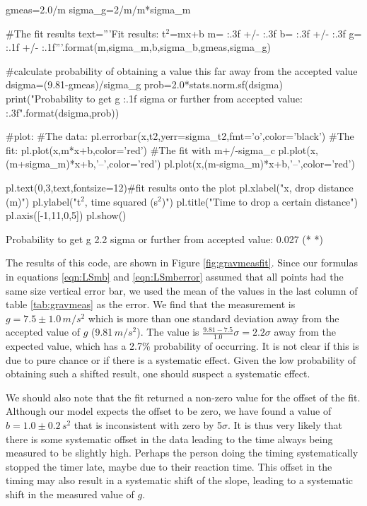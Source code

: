 \begin{example}
\begin{python}[caption = Linear fit with least squares]
gmeas=2.0/m
sigma_g=2/m/m*sigma_m

#The fit results
text='''Fit results: t$^2$=mx+b
m= {:.3f} +/- {:.3f}
b= {:.3f} +/- {:.3f}
g= {:.1f} +/- {:.1f}'''.format(m,sigma_m,b,sigma_b,gmeas,sigma_g)

#calculate probability of obtaining a value this far away from the accepted value
dsigma=(9.81-gmeas)/sigma_g
prob=2.0*stats.norm.sf(dsigma)
print("Probability to get g {:.1f} sigma or further from accepted value: {:.3f}".format(dsigma,prob))

#plot:
#The data:
pl.errorbar(x,t2,yerr=sigma_t2,fmt='o',color='black')
#The fit:
pl.plot(x,m*x+b,color='red')
#The fit with m+/-sigma_c
pl.plot(x,(m+sigma_m)*x+b,'--',color='red')
pl.plot(x,(m-sigma_m)*x+b,'--',color='red')

pl.text(0,3,text,fontsize=12)#fit results onto the plot
pl.xlabel("x, drop distance (m)")
pl.ylabel("t$^2$, time squared (s$^2$)")
pl.title("Time to drop a certain distance")
pl.axis([-1,11,0,5])
pl.show()

\end{python}
\begin{poutput}
Probability to get g 2.2 sigma or further from accepted value: 0.027
(*  *)
\end{poutput}
The results of this code, are shown in Figure \ref{fig:gravmeasfit}. Since our formulas in equations \ref{eqn:LSmb} and \ref{eqn:LSmberror} assumed that all points had the same size vertical error bar, we used the mean of the values in the last column of table \ref{tab:gravmeas} as the error. We find that the measurement is $g=7.5\pm1.0\, m/s^2$ which is more than one standard deviation away from the accepted value of $g$ (9.81\,$m/s^2$). The value is $\frac{9.81-7.5}{1.0}\sigma=2.2\sigma$ away from the expected value, which has a 2.7\% probability of occurring. It is not clear if this is due to pure chance or if there is a systematic effect. Given the low probability of obtaining such a shifted result, one should suspect a systematic effect. 

We should also note that the fit returned a non-zero value for the offset of the fit. Although our model expects the offset to be zero, we have found a value of $b=1.0\pm0.2\,s^2$ that is inconsistent with zero by 5$\sigma$. It is thus very likely that there is some systematic offset in the data leading to the time always being measured to be slightly high. Perhaps the person doing the timing systematically stopped the timer late, maybe due to their reaction time. This offset in the timing may also result in a systematic shift of the slope, leading to a systematic shift in the measured value of $g$. 


\end{example}
